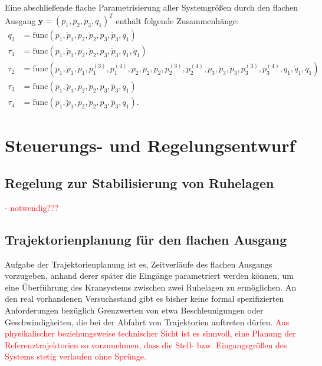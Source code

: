 Eine abschließende flache Parametrisierung aller Systemgrößen durch den flachen Ausgang $\mathbf{y} = (p_1, p_2, p_3, q_1)^T$ enthält folgende Zusammenhänge:
\begin{subequations}
	\begin{align}
		q_2 &= \mathrm{func}(p_1, \ddot{p}_1, p_2, \ddot{p}_2, p_3, \ddot{p}_3, q_1) \\
		\tau_1 &= \mathrm{func}(p_1, \ddot{p}_1, p_2, \ddot{p}_2, p_3, \ddot{p}_3, q_1, \ddot{q}_1) \\
		\tau_2 &= \mathrm{func}(p_1, \dot{p}_1, \ddot{p}_1, p_1^{(3)}, p_1^{(4)}, p_2, \dot{p}_2, \ddot{p}_2, p_2^{(3)}, p_2^{(4)}, p_3, \dot{p}_3, \ddot{p}_3, p_3^{(3)}, p_3^{(4)}, q_1, \dot{q}_1, \ddot{q}_1) \\
		\tau_3 &= \mathrm{func}(p_1, \ddot{p}_1, p_2, \ddot{p}_2, p_3, \ddot{p}_3, q_1) \\
		\tau_4 &= \mathrm{func}(p_1, \ddot{p}_1, p_2, \ddot{p}_2, p_3, \ddot{p}_3, q_1).
	\end{align}
\end{subequations}

\chapter{Steuerungs- und Regelungsentwurf}

\section{Regelung zur Stabilisierung von Ruhelagen}
- \textcolor{red}{notwendig???}

\section{Trajektorienplanung für den flachen Ausgang}
\label{sec:trajectory_flat_output}
Aufgabe der Trajektorienplanung ist es, Zeitverläufe des flachen Ausgangs vorzugeben, anhand derer später die Eingänge parametriert werden können, um eine Überführung des Kransystems zwischen zwei Ruhelagen zu ermöglichen. An den real vorhandenen Versuchsstand gibt es bisher keine formal spezifizierten Anforderungen bezüglich Grenzwerten von etwa Beschleunigungen oder Geschwindigkeiten, die bei der Abfahrt von Trajektorien auftreten dürfen. \textcolor{red}{Aus physikalischer beziehungsweise technischer Sicht ist es sinnvoll, eine Planung der Referenztrajektorien so vorzunehmen, dass die Stell- bzw. Eingangsgrößen des Systems stetig verlaufen ohne Sprünge.}


